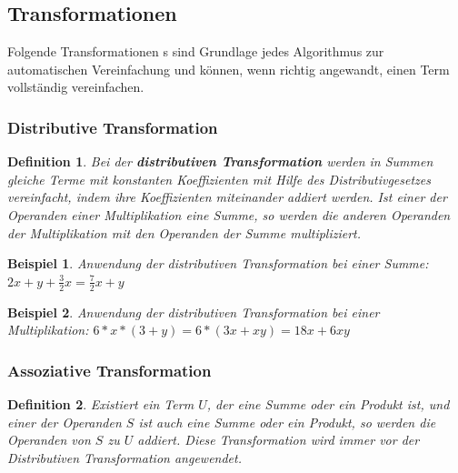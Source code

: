 \documentclass[11pt]{article}
\newtheorem{defin}{Definition}
\newtheorem{example}{Beispiel}
\begin{document}
\subsection{Transformationen}

Folgende Transformationen \citeauthor{CAS_MM}s \cite[64 - 79]{CAS_MM}
sind Grundlage jedes Algorithmus zur automatischen Vereinfachung und können,
wenn richtig angewandt, einen Term vollständig vereinfachen.

\subsubsection{Distributive Transformation}

\begin{defin}
  \label{def:distributive_transformation}
  Bei der \textbf{distributiven Transformation} werden in Summen 
  gleiche Terme mit konstanten Koeffizienten mit Hilfe des Distributivgesetzes vereinfacht, 
  indem ihre Koeffizienten miteinander addiert werden. 
  Ist einer der Operanden einer Multiplikation eine Summe, so werden die anderen Operanden
  der Multiplikation mit den Operanden der Summe multipliziert.
\end{defin}

\begin{example} \normalfont
  Anwendung der distributiven Transformation bei einer Summe: \newline
  $2x + y + \frac{3}{2}x = \frac{7}{2}x + y$
\end{example}

\begin{example} \normalfont
  Anwendung der distributiven Transformation bei einer Multiplikation: \newline
  $6 * x * (3 + y) = 6 * (3x + xy) = 18x + 6xy$
\end{example}

\subsubsection{Assoziative Transformation}

\begin{defin}
  \label{def:assoziative_transformation}
  Existiert ein Term $U$, der eine Summe oder ein Produkt ist, und einer der Operanden $S$ ist auch eine Summe 
  oder ein Produkt, so werden die Operanden von $S$ zu $U$ addiert. 
  Diese Transformation wird immer vor der Distributiven Transformation angewendet.
\end{defin}
\end{document}

